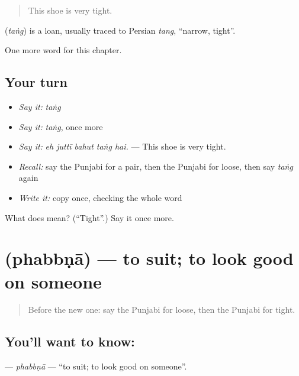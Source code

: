 \begin{quote}
This shoe is very tight.
\end{quote}

\begin{cousinweb}
\textbf{} (\emph{taṅg}) is a loan, usually traced to Persian \emph{tang}, \textquotedblleft{}narrow, tight\textquotedblright{}.
\end{cousinweb}

\begin{grammarlens}[title={What you've built}]
One more word for this chapter.
\end{grammarlens}

\subsection*{Your turn}
\begin{itemize}
\raggedright
  \item \emph{Say it:} \emph{taṅg}
  \item \emph{Say it:} \emph{taṅg}, once more
  \item \emph{Say it:} \emph{eh juttī bahut taṅg hai.} — This shoe is very tight.
  \item \emph{Recall:} say the Punjabi for a pair, then the Punjabi for loose, then say \emph{taṅg} again
  \item \emph{Write it:} copy \textbf{} once, checking the whole word
\end{itemize}

\begin{tcolorbox}[breakable,colback=teal!4,colframe=teal!35!black,title={Before you move on}]
What does  mean? (\textquotedblleft{}Tight\textquotedblright{}.) Say it once more.
\end{tcolorbox}
\section[\texorpdfstring{\pa{ਫੱਬਣਾ} (phabbṇā)}{ਫੱਬਣਾ (phabbṇā)}]{ (phabbṇā) — to suit; to look good on someone}

\label{lesson:PA-C275-phabbna}



\begin{quote}
Before the new one: say the Punjabi for loose, then the Punjabi for tight.
\end{quote}

\subsection*{You'll want to know: }
\textbf{} — \emph{phabbṇā} — \textquotedblleft{}to suit; to look good on someone\textquotedblright{}.

